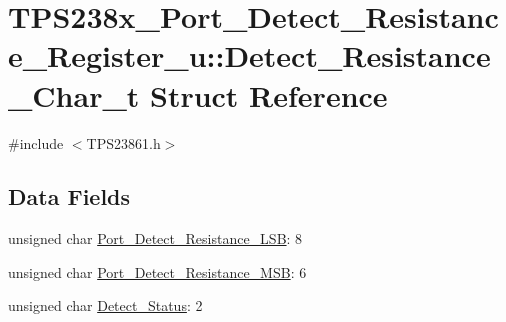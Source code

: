 \hypertarget{struct_t_p_s238x___port___detect___resistance___register__u_1_1_detect___resistance___char__t}{\section{T\-P\-S238x\-\_\-\-Port\-\_\-\-Detect\-\_\-\-Resistance\-\_\-\-Register\-\_\-u\-:\-:Detect\-\_\-\-Resistance\-\_\-\-Char\-\_\-t Struct Reference}
\label{struct_t_p_s238x___port___detect___resistance___register__u_1_1_detect___resistance___char__t}
}


{\ttfamily \#include $<$T\-P\-S23861.\-h$>$}

\subsection*{Data Fields}
\begin{DoxyCompactItemize}
\item 
unsigned char \hyperlink{struct_t_p_s238x___port___detect___resistance___register__u_1_1_detect___resistance___char__t_ad7005a4ad9f7e1a65a3820d3f984a846}{Port\-\_\-\-Detect\-\_\-\-Resistance\-\_\-\-L\-S\-B}\-: 8
\item 
unsigned char \hyperlink{struct_t_p_s238x___port___detect___resistance___register__u_1_1_detect___resistance___char__t_a3a71c82e750ac6dfb3d92fdb4d2b6464}{Port\-\_\-\-Detect\-\_\-\-Resistance\-\_\-\-M\-S\-B}\-: 6
\item 
unsigned char \hyperlink{struct_t_p_s238x___port___detect___resistance___register__u_1_1_detect___resistance___char__t_aac39cedc829a996509bf628c6cd9b74a}{Detect\-\_\-\-Status}\-: 2
\end{DoxyCompactItemize}


